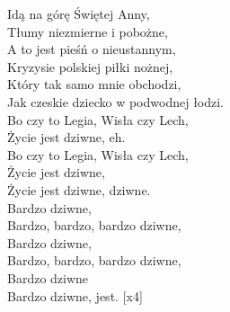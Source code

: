 \begin{text}
Idą na górę Świętej Anny,\\
Tłumy niezmierne i pobożne,\\
A to jest pieśń o nieustannym,\\
Kryzysie polskiej piłki nożnej,\\
Który tak samo mnie obchodzi,\\
Jak czeskie dziecko w podwodnej łodzi.\\

Bo czy to Legia, Wisła czy Lech,\\
Życie jest dziwne, eh.\\
Bo czy to Legia, Wisła czy Lech,\\
Życie jest dziwne,\\
Życie jest dziwne, dziwne.\\

Bardzo dziwne,\\
Bardzo, bardzo, bardzo dziwne,\\
Bardzo dziwne,\\
Bardzo, bardzo, bardzo dziwne,\\
Bardzo dziwne\\
Bardzo dziwne, jest. [x4]\\
\end{text}